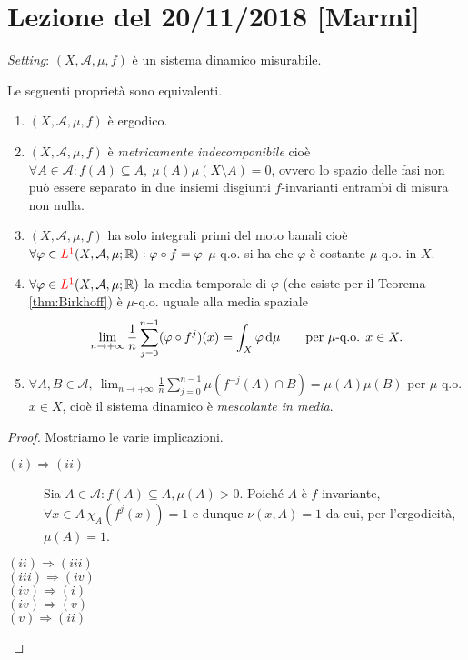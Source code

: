\section{Lezione del 20/11/2018 [Marmi]}

\emph{Setting}: $ (X, \mathcal{A}, \mu, f) $ è un sistema dinamico misurabile.

\begin{thm}
    Le seguenti proprietà sono equivalenti.
    \begin{enumerate}[label=(\roman*)]
        \item $ (X, \mathcal{A}, \mu, f) $ è ergodico.
        \item $ (X, \mathcal{A}, \mu, f) $ è \emph{metricamente indecomponibile} cioè $ \forall A \in \mathcal{A} : f(A) \subseteq A, \ \mu(A) \mu(X \setminus A) = 0 $, ovvero lo spazio delle fasi non può essere separato in due insiemi disgiunti $ f $-invarianti entrambi di misura non nulla.
        \item $ (X, \mathcal{A}, \mu, f) $ ha solo integrali primi del moto banali cioè $ \forall \varphi \in \textcolor{red}{L^1}(X, \mathcal{A}, \mu; \mathbb{R}) : \varphi \circ f = \varphi $ $ \mu $-q.o. si ha che $ \varphi $ è costante $ \mu $-q.o. in $ X $.
        \item $ \forall \varphi \in \textcolor{red}{L^1}(X, \mathcal{A}, \mu; \mathbb{R}) $ la media temporale di $ \varphi $ (che esiste per il Teorema \ref{thm:Birkhoff}) è $ \mu $-q.o. uguale alla media spaziale
        \[
            \lim_{n \to +\infty} \frac{1}{n} \sum_{j=0}^{n-1} (\varphi \circ f^j)(x) = \int_{X} \varphi \dif{\mu} \qquad \text{per } \mu\text{-q.o. } x \in X.
        \]
        \item $ \forall A, B \in \mathcal{A}, \ \displaystyle{\lim_{n \to +\infty} \frac{1}{n} \sum_{j=0}^{n-1} \mu(f^{-j}(A) \cap B) = \mu(A) \mu(B)} $ per $ \mu $-q.o. $ x \in X $, cioè il sistema dinamico è \emph{mescolante in media}.
    \end{enumerate}
\end{thm}
\begin{proof}
    Mostriamo le varie implicazioni.
    \begin{description}
        \item[$ (i) \Rightarrow (ii) $] Sia $ A\in\mathcal{A} : f(A) \subseteq A, \mu(A) > 0 $. Poiché $ A $ è $ f $-invariante, $ \forall x\in A\ \chi_A(f^j(x)) = 1 $ e dunque $ \nu(x,A) = 1 $ da cui, per l'ergodicità, $ \mu(A) = 1 $.
        \item[$ (ii) \Rightarrow (iii) $]
        \item[$ (iii) \Rightarrow (iv) $]
        \item[$ (iv) \Rightarrow (i) $]
        \item[$ (iv) \Rightarrow (v) $]
        \item[$ (v) \Rightarrow (ii) $]
    \end{description}
\end{proof}

